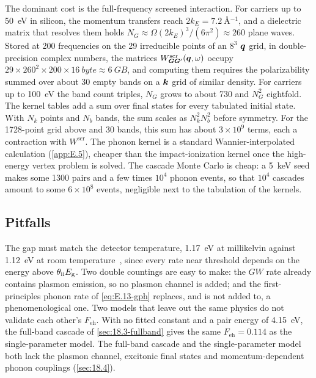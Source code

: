 The dominant cost is the full-frequency screened interaction. For carriers up to \SI{50}{eV} in silicon, the momentum transfers reach $2k_E = \SI{7.2}{\angstrom^{-1}}$, and a dielectric matrix that resolves them holds $N_G \approx \Omega(2k_E)^3/(6\pi^2) \approx 260$ plane waves. Stored at 200 frequencies on the 29 irreducible points of an $8^3$ $\bm{q}$ grid, in double-precision complex numbers, the matrices $W^{\mathrm{scr}}_{\bm{G}\bm{G}'}(\bm{q}, \omega)$ occupy $29\times260^2\times200\times\SI{16}{byte} \approx \SI{6}{GB}$, and computing them requires the polarizability summed over about 30 empty bands on a $\bm{k}$ grid of similar density. For carriers up to \SI{100}{eV} the band count triples, $N_G$ grows to about 730 and $N_G^2$ eightfold. The kernel tables add a sum over final states for every tabulated initial state. With $N_k$ points and $N_b$ bands, the sum scales as $N_k^2N_b^2$ before symmetry. For the 1728-point grid above and 30 bands, this sum has about $3\times10^9$ terms, each a contraction with $W^{\mathrm{scr}}$. The phonon kernel is a standard Wannier-interpolated calculation (\cref{app:E.5}), cheaper than the impact-ionization kernel once the high-energy vertex problem is solved. The cascade Monte Carlo is cheap: a \SI{5}{keV} seed makes some 1300 pairs and a few times $10^4$ phonon events, so that $10^4$ cascades amount to some $6\times10^8$ events, negligible next to the tabulation of the kernels.

\subsection{Pitfalls}

The gap must match the detector temperature, \SI{1.17}{eV} at millikelvin against \SI{1.12}{eV} at room temperature~\cite[Table~I]{ramanathan2020ionization}, since every rate near threshold depends on the energy above $\theta_{\mathrm{ii}}E_{\mathrm{g}}$. Two double countings are easy to make: the $GW$ rate already contains plasmon emission, so no plasmon channel is added; and the first-principles phonon rate of \cref{eq:E.13-gph} replaces, and is not added to, a phenomenological one. Two models that leave out the same physics do not validate each other's $F_{\mathrm{eh}}$. With no fitted constant and a pair energy of \SI{4.15}{eV}, the full-band cascade of \cref{sec:18.3-fullband} gives the same $F_{\mathrm{eh}} = 0.114$ as the single-parameter model. The full-band cascade and the single-parameter model both lack the plasmon channel, excitonic final states and momentum-dependent phonon couplings (\cref{sec:18.4}).

